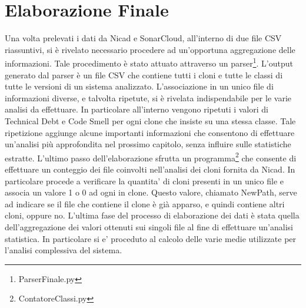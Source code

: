 \section{Elaborazione Finale}
Una volta prelevati i dati da Nicad e SonarCloud, all'interno di due file CSV riassuntivi, si è rivelato necessario procedere ad un'opportuna aggregazione delle informazioni. Tale procedimento è stato attuato attraverso un parser\footnote{ParserFinale.py}. L'output generato dal parser è un file CSV che contiene tutti i cloni e tutte le classi di tutte le versioni di un sistema analizzato. L'associazione in un unico file di informazioni diverse, e talvolta ripetute, si è rivelata indispendabile per le varie analisi da effettuare. In particolare all'interno vengono ripetuti i valori di Technical Debt e Code Smell per ogni clone che insiste su una stessa classe. Tale ripetizione aggiunge alcune importanti informazioni che consentono di effettuare un'analisi più approfondita nel prossimo capitolo, senza influire sulle statistiche estratte.
L'ultimo passo dell'elaborazione sfrutta un programma\footnote{ContatoreClassi.py} che consente di effettuare un conteggio dei file coinvolti nell'analisi dei cloni fornita da Nicad. In particolare procede a verificare la quantita' di cloni presenti in un unico file e associa un valore 1 o 0 ad ogni in clone. Questo valore, chiamato NewPath, serve ad indicare se il file che contiene il clone è già apparso, e quindi contiene altri cloni, oppure no.
L'ultima fase del processo di elaborazione dei dati è stata quella dell'aggregazione dei valori ottenuti sui singoli file al fine di effettuare un'analisi statistica. In particolare si e' proceduto al calcolo delle varie medie utilizzate per l'analisi complessiva del sistema.
